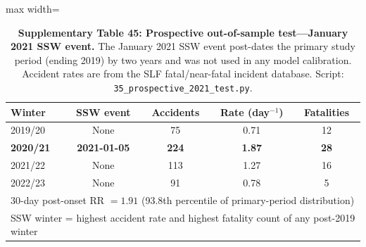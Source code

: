 \documentclass[11pt,letterpaper]{article}
\begin{document}
\begin{table}[!ht]
\centering
\caption{\textbf{Supplementary Table 45: Prospective out-of-sample test---January 2021 SSW event.} The January 2021 SSW event post-dates the primary study period (ending 2019) by two years and was not used in any model calibration. Accident rates are from the SLF fatal/near-fatal incident database. Script: \texttt{35\_prospective\_2021\_test.py}.}
\label{tab:prospective_2021}
\small
\begin{adjustbox}{max width=\textwidth}
\begin{tabular}{lcccc}
\toprule
Winter & SSW event & Accidents & Rate (day$^{-1}$) & Fatalities \\
\midrule
2019/20 & None & 75 & 0.71 & 12 \\
\textbf{2020/21} & \textbf{2021-01-05} & \textbf{224} & \textbf{1.87} & \textbf{28} \\
2021/22 & None & 113 & 1.27 & 16 \\
2022/23 & None & 91 & 0.78 & 5 \\
\midrule
\multicolumn{5}{l}{\footnotesize 30-day post-onset RR $= 1.91$ (93.8th percentile of primary-period distribution)} \\
\multicolumn{5}{l}{\footnotesize SSW winter = highest accident rate and highest fatality count of any post-2019 winter} \\
\bottomrule
\end{tabular}
\end{adjustbox}
\end{table}
\end{document}
